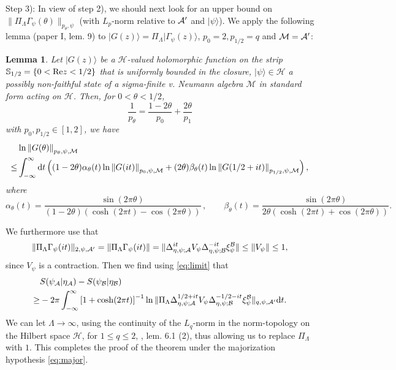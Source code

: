 \documentclass[english,a4paper,12pt]{article}
\newtheorem{lemma}{Lemma}
\def\sH{\mathscr{H}}
\def\bS{{\mathbb S}}
\def\cA{{\mathfrak A}}
\def\cB{{\mathfrak B}}
\def\cM{{\mathfrak M}}
\newcommand{\ca}[1]{{\cal #1}}
\newcommand{\ben}{\begin{equation}}
\newcommand{\een}{\end{equation}}
\def\cA{{\ca A}}
\def\cB{{\ca B}}
\def\cM{{\ca M}}
\newcommand{\dd}{{\rm d}}
\renewcommand{\log}{\operatorname{ln}}
\begin{document}
\medskip

Step 3): In view of step 2), we should next look for an upper bound on $ \|\Pi_\Lambda \Gamma_\psi(\theta) \|_{p_\theta,\psi}$
(with $L_p$-norm relative to $\cA'$ and $|\psi\rangle$).  
We apply the following lemma (paper I, lem. 9) to $|G(z)\rangle = \Pi_\Lambda |\Gamma_\psi(z)\rangle$, $p_0=2, p_{1/2}=q$ and 
$\cM=\cA'$:

\begin{lemma}
\label{lem:hirsch}
Let $|G(z)\rangle$ be a $\sH$-valued holomorphic function on the strip $\bS_{1/2}=\{0<{\rm Re}z<1/2\}$ 
that is uniformly bounded in the closure, $|\psi\rangle \in \sH$ a possibly non-faithful state of a
sigma-finite v. Neumann algebra $\mathcal M$ in standard form acting on $\sH$. Then, for $0<\theta<1/2$, 
\ben
\frac{1}{p_\theta} = \frac{1-2\theta}{p_0} + \frac{2\theta}{p_1}
\een
with $p_0,p_{1/2} \in [1,2]$, we have 
\begin{align}
\label{himp}
& \log \left\| G(\theta)\right\|_{p_\theta, \psi, \cM} \\
  \leq  & \int_{-\infty}^{\infty} {\rm d} t 
  \left(
 (1-2 \theta)  \alpha_\theta(t) \log \left\| G(it) \right\|_{p_0, \psi,\cM} + (2\theta)  \beta_\theta(t) 
  \log  \left\| G(1/2+it) \right\|_{p_{1/2}, \psi,\cM} \right),
  \nonumber
\end{align}
where
\begin{equation}
\alpha_\theta(t) = \frac{ \sin(2\pi\theta)}{(1-2\theta)(\cosh(2\pi t ) - \cos(2\pi \theta)) }\,,
\qquad \beta_\theta(t) = \frac{ \sin(2\pi\theta)}{2 \theta(\cosh(2\pi t ) + \cos(2\pi \theta)) }.
\end{equation}
\end{lemma}
\noindent
We furthermore use that 
\ben
\| \Pi_\Lambda \Gamma_\psi(it) \|_{2,\psi,\cA'} = \|\Pi_\Lambda \Gamma_\psi(it) \| 
= \|  \Delta_{\eta,\psi;\cA}^{it} V_\psi \Delta_{\eta,\psi;\cB}^{-it} \xi_{\psi}^{\cB}\| \le \| V_\psi \| \le 1, 
\een
since $V_\psi$ is a contraction. Then we find using \eqref{eq:limit} that 
\ben
\label{eq:statL}
\begin{split}
& S(\psi_\cA | \eta_\cA) - S(\psi_\cB | \eta_\cB) \\
\ge &
-2\pi \int_{-\infty}^\infty \left[ 1+\cosh(2\pi t) \right]^{-1} 
 \log \| \Pi_\Lambda \Delta_{\eta,\psi;\cA}^{1/2+it} V_\psi \Delta_{\eta,\psi;\cB}^{-1/2-it} \xi_{\psi}^{\cB} \|_{q,\psi,\cA'} \dd t. 
 \end{split}
\een  
We can let $\Lambda \to \infty$, using the 
continuity of the $L_q$-norm in the norm-topology on the Hilbert space $\sH$, 
for $1 \le q \le 2$, \cite{AM}, lem. 6.1 (2), thus allowing us to replace $\Pi_\Lambda$ with $1$.
This completes the proof of the theorem under the majorization hypothesis \eqref{eq:major}.
\end{document}

